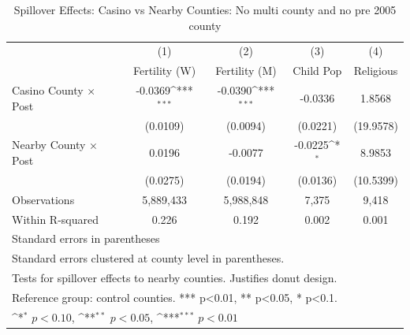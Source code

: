 \begin{table}[htbp]\centering
\def\sym#1{\ifmmode^{#1}\else\(^{#1}\)\fi}
\caption{Spillover Effects: Casino vs Nearby Counties: No multi county and no pre 2005 county}
\begin{tabular}{l*{4}{c}}
\hline\hline
            &\multicolumn{1}{c}{(1)}&\multicolumn{1}{c}{(2)}&\multicolumn{1}{c}{(3)}&\multicolumn{1}{c}{(4)}\\
            &\multicolumn{1}{c}{Fertility (W)}&\multicolumn{1}{c}{Fertility (M)}&\multicolumn{1}{c}{Child Pop}&\multicolumn{1}{c}{Religious}\\
\hline
Casino County × Post&     -0.0369\sym{***}&     -0.0390\sym{***}&     -0.0336         &      1.8568         \\
            &    (0.0109)         &    (0.0094)         &    (0.0221)         &   (19.9578)         \\
[1em]
Nearby County × Post&      0.0196         &     -0.0077         &     -0.0225\sym{*}  &      8.9853         \\
            &    (0.0275)         &    (0.0194)         &    (0.0136)         &   (10.5399)         \\
\hline
Observations&   5,889,433         &   5,988,848         &       7,375         &       9,418         \\
Within R-squared&       0.226         &       0.192         &       0.002         &       0.001         \\
\hline\hline
\multicolumn{5}{l}{\footnotesize Standard errors in parentheses}\\
\multicolumn{5}{l}{\footnotesize Standard errors clustered at county level in parentheses.}\\
\multicolumn{5}{l}{\footnotesize Tests for spillover effects to nearby counties. Justifies donut design.}\\
\multicolumn{5}{l}{\footnotesize Reference group: control counties. *** p<0.01, ** p<0.05, * p<0.1.}\\
\multicolumn{5}{l}{\footnotesize \sym{*} \(p<0.10\), \sym{**} \(p<0.05\), \sym{***} \(p<0.01\)}\\
\end{tabular}
\end{table}
